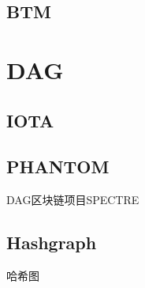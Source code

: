 \documentclass[UTF8]{ctexart}
\begin{document}
\subsection{BTM}

\section{DAG}

\subsection{IOTA}

\subsection{PHANTOM}

DAG区块链项目SPECTRE

\subsection{Hashgraph}

哈希图

\ifx\allfiles\undefined
\end{document}
